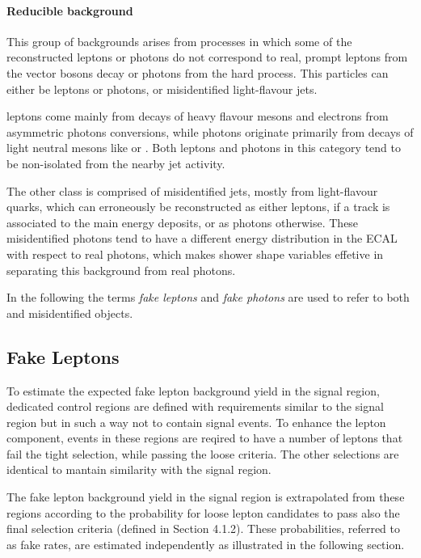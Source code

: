 \paragraph{Reducible background\\}
This group of backgrounds arises from processes in which some of the reconstructed leptons or photons do not correspond to real, prompt leptons from the vector bosons decay or photons from the hard process.
This particles can either be \nonprompt leptons or photons, or misidentified light-flavour jets.

\Nonprompt leptons come mainly from decays of heavy flavour mesons and electrons from asymmetric photons conversions,
while \nonprompt photons originate primarily from decays of light neutral mesons like \PGpz or \PGh.
Both leptons and photons in this category tend to be non-isolated from the nearby jet activity.

The other class is comprised of misidentified jets, mostly from light-flavour quarks, which can erroneously be reconstructed as either leptons,
if a track is associated to the main energy deposits, or as photons otherwise.
These misidentified photons tend to have a different energy distribution in the ECAL with respect to real photons,
which makes shower shape variables effetive in separating this background from real photons.

In the following the terms \textit{fake leptons} and \textit{fake photons} are used to refer to both \nonprompt and misidentified objects.


\subsection{Fake Leptons}
To estimate the expected fake lepton background yield in the signal region,
dedicated control regions are defined with requirements similar to the signal region but in such a way not to contain signal events.
To enhance the \nonprompt lepton component, events in these regions are reqired to
have a number of leptons that fail the tight selection, while passing the loose criteria.
The other selections are identical to mantain similarity with the signal region.

The fake lepton background yield in the signal region is extrapolated from these regions
according to the probability for loose lepton candidates to pass also the final selection criteria (defined in Section 4.1.2).
These probabilities, referred to as fake rates, are estimated independently as illustrated in the following section.

